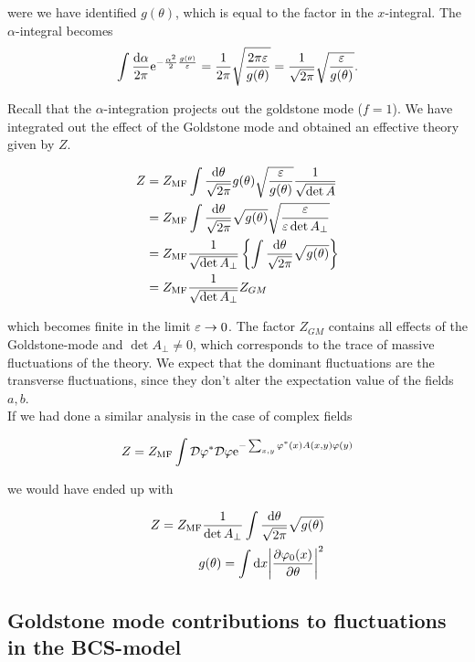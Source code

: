 were we have identified $g(\theta)$, which is equal to the factor in the $x$-integral. The $\alpha$-integral becomes 
\begin{align*}
    \int \frac{\dd \alpha}{2\pi} \mathrm{e}^{-\frac{\alpha^2}{2}\frac{g(\theta)}{\varepsilon}} = \frac{1}{2\pi}\sqrt{\frac{2\pi \varepsilon}{g(\theta)}} =  \frac{1}{\sqrt{
    2\pi}}\sqrt{\frac{\varepsilon}{g(\theta)}}. 
\end{align*}

Recall that the $\alpha$-integration projects out the goldstone mode ($f = 1$). We have integrated out the effect of the Goldstone mode and obtained an effective theory given by $Z$. 

\begin{align*}
    Z &= Z_{\text{MF}}\int \frac{\dd \theta}{\sqrt{2\pi}} g(\theta) \sqrt{\frac{\varepsilon}{g(\theta)}} \frac{1}{\sqrt{\det A}} \\
    &= Z_{\text{MF}}\int \frac{\dd \theta}{\sqrt{2\pi}} \sqrt{
    g(\theta)} \sqrt{\frac{\varepsilon}{\varepsilon\det A_\perp}} \\ 
    &= Z_{\text{MF}} \frac{1}{\sqrt{\det A_\perp}} \left\{ \int \frac{\dd \theta}{\sqrt{2\pi}}\sqrt{g(\theta)} \right\} \\
    &= Z_{\text{MF}} \frac{1}{\sqrt{\det A_\perp}} Z_{GM}
\end{align*}

which becomes finite in the limit $\varepsilon \to 0$. The factor $Z_{GM}$ contains all effects of the Goldstone-mode and $\det A_\perp \neq 0$, which corresponds to the trace of massive fluctuations of the theory. We expect that the dominant fluctuations are the transverse fluctuations, since they don't alter the expectation value of the fields $a,b$. \\ 

If we had done a similar analysis in the case of complex fields

\begin{align*}
    Z = Z_{\text{MF}} \int \mathcal{D} \varphi^* \mathcal{D} \varphi \mathrm{e}^{-\sum_{x,y} \varphi^*(x) A(x,y) \varphi (y)}
\end{align*}

we would have ended up with 

\begin{align*}
    Z = Z_{\text{MF}} \frac{1}{\det A_\perp} \int \frac{\dd \theta}{\sqrt{2\pi}}\sqrt{g(\theta)} \\ g(\theta) = \int \dd x \abs{\pdv{\varphi_0(x)}{\theta}}^2 
\end{align*}

\subsection{Goldstone mode contributions to fluctuations in the BCS-model}

